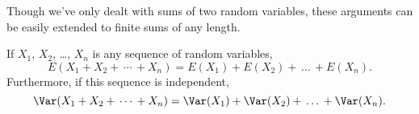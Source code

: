 Though we've only dealt with sums of two random variables, these arguments can be easily extended to finite sums of any length.

\begin{cor}\label{expectationandvarianceofindependentsum}If $X_1$, $X_2$, \dots , $X_n$ is any sequence of random variables,
$$E(X_1 + X_2 + \, \cdots \, + X_n) = E(X_1) + E(X_2) + \, \dots \, + E(X_n).$$
Furthermore, if this sequence is independent,
$$\Var(X_1 + X_2 + \, \cdots \, + X_n) = \Var(X_1) + \Var(X_2) + \, \dots \, + \Var(X_n).$$
\end{cor}


